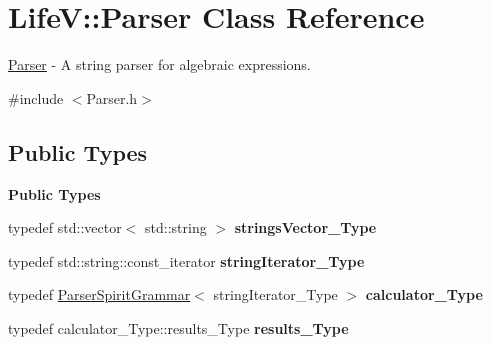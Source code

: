 \hypertarget{classLifeV_1_1Parser}{}\section{LifeV\+:\+:Parser Class Reference}
\label{classLifeV_1_1Parser}


\hyperlink{classLifeV_1_1Parser}{Parser} -\/ A string parser for algebraic expressions.  




{\ttfamily \#include $<$Parser.\+h$>$}

\subsection*{Public Types}
\begin{Indent}\textbf{ Public Types}\par
\begin{DoxyCompactItemize}
\item 
\mbox{\label{classLifeV_1_1Parser_af87d4a11879da16a0bba7bf81f98b957}} 
typedef std\+::vector$<$ std\+::string $>$ {\bfseries strings\+Vector\+\_\+\+Type}
\item 
\mbox{\label{classLifeV_1_1Parser_a9491c77a9093b41468ca54b865c893ff}} 
typedef std\+::string\+::const\+\_\+iterator {\bfseries string\+Iterator\+\_\+\+Type}
\item 
\mbox{\label{classLifeV_1_1Parser_ae9a67e24d777a1f962026f5e1274b61a}} 
typedef \hyperlink{classLifeV_1_1ParserSpiritGrammar}{Parser\+Spirit\+Grammar}$<$ string\+Iterator\+\_\+\+Type $>$ {\bfseries calculator\+\_\+\+Type}
\item 
\mbox{\label{classLifeV_1_1Parser_a9e5861cc337d7534e8641b1709d193db}} 
typedef calculator\+\_\+\+Type\+::results\+\_\+\+Type {\bfseries results\+\_\+\+Type}
\end{DoxyCompactItemize}
\end{Indent}
